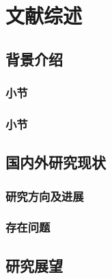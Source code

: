 \cleardoublepage
\chapter{文献综述}

\section{背景介绍}

\subsection{小节}

\subsection{小节}

\section{国内外研究现状}

\subsection{研究方向及进展}

\subsection{存在问题}

\section{研究展望}

\cite{testbib}
\printbibliography[heading=subbibliography]
